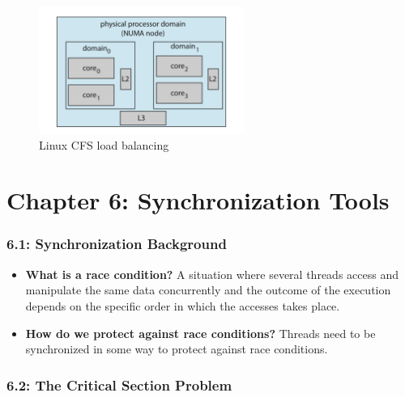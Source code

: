 \documentclass[12pt]{article}
\begin{document}
\begin{itemize}
    \begin{figure}[ht]
        \centering
        \includegraphics[width=0.6\textwidth]{figures/cfs-load-balancing.jpg}
        \caption{Linux CFS load balancing}
        \label{fig:cfs-load-balancing}
    \end{figure}
\end{itemize}

\part*{Chapter 6: Synchronization Tools}

\section*{6.1: Synchronization Background}

\begin{itemize}
    \item \textbf{What is a race condition?} A situation where several threads access and manipulate the same data concurrently and the outcome of the execution depends on the specific order in which the accesses takes place.
    \item \textbf{How do we protect against race conditions?} Threads need to be synchronized in some way to protect against race conditions.
\end{itemize}

\section*{6.2: The Critical Section Problem}
\end{document}
